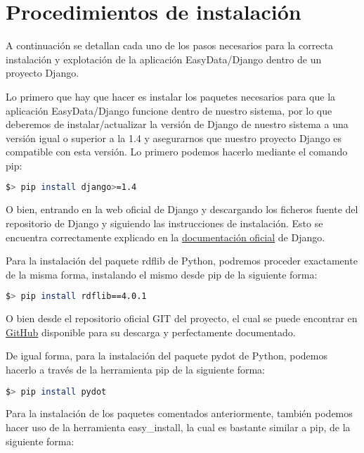 \section{Procedimientos de instalación}
\label{sec:procinsta}

A continuación se detallan cada uno de los pasos necesarios para la correcta
instalación y explotación de la aplicación EasyData/Django dentro de un proyecto
Django.

Lo primero que hay que hacer es instalar los paquetes necesarios para que la
aplicación EasyData/Django funcione dentro de nuestro sistema, por lo que
deberemos de instalar/actualizar la versión de Django de nuestro sistema a una
versión igual o superior a la 1.4 y asegurarnos que nuestro proyecto Django es
compatible con esta versión. Lo primero podemos hacerlo mediante el comando pip:

\begin{lstlisting}[frame=L, language=bash, basicstyle=\footnotesize]
$> pip install django>=1.4
\end{lstlisting}

O bien, entrando en la web oficial de Django y descargando los ficheros fuente
del repositorio de Django y siguiendo las instrucciones de instalación. Esto se
encuentra correctamente explicado en la
\href{https://www.djangoproject.com/download/}{documentación oficial} de Django.

Para la instalación del paquete rdflib de Python, podremos proceder exactamente
de la misma forma, instalando el mismo desde pip de la siguiente forma:

\begin{lstlisting}[frame=L, language=bash, basicstyle=\footnotesize]
$> pip install rdflib==4.0.1
\end{lstlisting}

O bien desde el repositorio oficial GIT del proyecto, el cual se puede encontrar
en \href{https://github.com/RDFLib/rdflib}{GitHub} disponible para su descarga y
perfectamente documentado.

De igual forma, para la instalación del paquete pydot de Python, podemos hacerlo
a través de la herramienta pip de la siguiente forma:

\begin{lstlisting}[frame=L, language=bash, basicstyle=\footnotesize]
$> pip install pydot
\end{lstlisting}

Para la instalación de los paquetes comentados anteriormente, también podemos
hacer uso de la herramienta easy\_install, la cual es bastante similar a pip, de
la siguiente forma:

